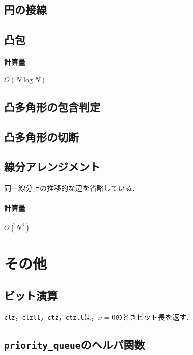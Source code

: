 \documentclass[landscape,twocolumn,9pt]{jsarticle}
\begin{document}
\subsection{円の接線}


\subsection{凸包}
\paragraph{計算量} $O(N\log N)$


\subsection{凸多角形の包含判定}


\subsection{凸多角形の切断}


\subsection{線分アレンジメント}
同一線分上の推移的な辺を省略している．
\paragraph{計算量} $O(N^3)$


\section{その他}%
\subsection{ビット演算}
\texttt{clz}，\texttt{clzll}，\texttt{ctz}，\texttt{ctzll}は，$x=0$のときビット長を返す．


\subsection{\texttt{priority\_queue}のヘルパ関数}

\end{document}
